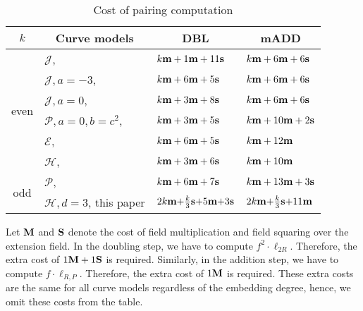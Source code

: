 \begin{table}[h]
\centering
\caption{Cost of pairing computation}

\begin{tabular}{ l | l | l | l}
\hline
\multicolumn{1}{c|}{$k$}
&\multicolumn{1}{c|}{Curve models}	&\multicolumn{1}{c|}{DBL}	&\multicolumn{1}{c}{mADD}	\\
\hline
\multicolumn{1}{c|}{\multirow{6}{*}{even}}
&$\mathcal{J}$, \cite{2008/IonicaJoux08} \cite{2009/fastertate}
				&$k\textbf{m} + 1\textbf{m} + 11\textbf{s}	$	&$k\textbf{m} + 6\textbf{m} + 6\textbf{s}$	\\
&$\mathcal{J},a = -3$, \cite{2009/fastertate}
				&$k\textbf{m} + 6\textbf{m} + 5\textbf{s}$		&$k\textbf{m} + 6\textbf{m} + 6\textbf{s}$	\\
&$\mathcal{J},a = 0$, \cite{2009/fastertate}		
				&$k\textbf{m} + 3\textbf{m} + 8\textbf{s}$		&$k\textbf{m} + 6\textbf{m} + 6\textbf{s}$	\\
&$\mathcal{P},a = 0, b = c^2$, \cite{2009/craig}
				&$k\textbf{m} + 3\textbf{m} + 5\textbf{s}$		&$k\textbf{m} + 10\textbf{m} + 2\textbf{s}$	\\
&$\mathcal{E}$, \cite{2009/fastertate}			
				&$k\textbf{m} + 6\textbf{m} + 5\textbf{s}$		&$k\textbf{m} + 12\textbf{m}$	\\
&$\mathcal{H}$, \cite{2010/Gu}	&$k\textbf{m} + 3\textbf{m} + 6\textbf{s}$		&$k\textbf{m} + 10\textbf{m}$	\\
\hline
\multicolumn{1}{c|}{\multirow{2}{*}{odd}}
&$\mathcal{P}$, \cite{2010/CLN}	&$k\textbf{m} + 6\textbf{m} + 7\textbf{s}$		&$k\textbf{m} + 13\textbf{m} + 3\textbf{s}$	\\
&$\mathcal{H},d=3$, this paper
				&$2k\textbf{m} {+} \frac{k}{3}\textbf{s} {+} 5\textbf{m} {+} 3\textbf{s}$
									&$2k\textbf{m} {+} \frac{k}{3}\textbf{s} {+} 11\textbf{m}$	\\
\hline
\end{tabular}
\label{tbl-cmp}


\end{table}

Let $\textbf{M}$ and $\textbf{S}$ denote the cost of field multiplication and field squaring over the extension field.
In the doubling step,
we have to compute $f^2 \cdot \ell_{2R}$.
Therefore, the extra cost of $1\textbf{M} + 1\textbf{S}$ is required.
Similarly, in the addition step,
we have to compute $f \cdot \ell_{R,P}$.
Therefore, the extra cost of $1\textbf{M}$ is required.
These extra costs are the same for all curve models regardless of the embedding degree, hence, we omit these costs from the table.

